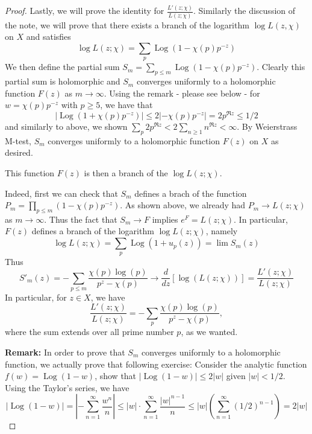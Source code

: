 \documentclass[11pt,letterpaper]{article}
\DeclareMathOperator{\1}{\mathbbm{1}}
\DeclareMathOperator{\Log}{Log}
\begin{document}
\begin{proof}
  Lastly, we will prove the identity for $\frac{L'(z;\chi)}{L(z;\chi)}$. Similarly the discussion of the note, we will prove that
  there exists a branch of the logarithm $\log L(z,\chi)$ on $X$ and satisfies
  \[\log L(z;\chi) = \sum_p \Log(1-\chi(p)p^{-z})\]
  We then define the partial sum $S_m = \sum_{p\le m} \Log(1-\chi(p)p^{-z})$. Clearly this partial sum is holomorphic and $S_m$ converges uniformly
  to a holomorphic function $F(z)$  as $ m \to \infty$. Using the remark - please see below - for $w = \chi(p)p^{-z}$ with $p \ge 5$, we have that
  \[\left|\Log(1+\chi(p)p^{-z})\right| \le 2|-\chi(p)p^{-z}| =2p^{\Re z} \le 1/2\]
  and similarly to above, we shown $\sum_{p}2p^{\Re z} <2 \sum_{n\ge 1}n^{\Re z} <\infty$. By Weierstrass M-test, $S_m$ converges uniformly to a holomorphic function $F(z)$ on $X$ as desired.

  This function $F(z)$ is then a branch of the $\log L(z;\chi)$.

  Indeed, first we can check that $S_m$ defines a brach of the function $P_m= \prod_{p \le m} (1-\chi(p)p^{-z})$. As shown above,
  we already had $P_m \to L(z;\chi)$ as $m \to \infty$. Thus the fact that $S_m \to F$ implies $e^F = L(z;\chi)$. In particular,
  $F(z)$ defines a branch of the logarithm  $\log L(z;\chi)$, namely
  \[\log L(z;\chi) = \sum_{p} \Log(1+u_p(z)) = \lim S_m(z)\]
  Thus
  \[S'_m(z) = -\sum_{p \le m} \dfrac{\chi(p)\log(p)}{p^z-\chi(p)} \to \frac{d}{dz}\left[\log(L(z;\chi))\right] = \dfrac{L'(z;\chi)}{L(z;\chi)}\]
  In particular, for $z \in X$, we have
  \[\dfrac{L'(z;\chi)}{L(z;\chi)}= -\sum_{p } \dfrac{\chi(p)\log(p)}{p^z-\chi(p)},\]
  where the sum extends over all prime number $p$, as we wanted.

  \textbf{Remark: } In order to prove that $S_m$ converges uniformly to a holomorphic function, we actually prove that following exercise:
  Consider the analytic function $f(w) = \Log(1-w)$, show that $| \Log(1-w)| \le 2|w|$ given $|w|<1/2$. Using the Taylor's series, we have
  \[ \left|\Log(1-w)\right| =\left| -\sum_{n=1}^\infty \dfrac{w^n}{n}\right| \le |w| \cdot \sum_{n=1}^\infty \dfrac{|w|^{n-1}}{n} \le |w| \left(\sum_{n=1}^\infty (1/2)^{n-1} \right) =2|w|\]
\end{proof}
\end{document}
